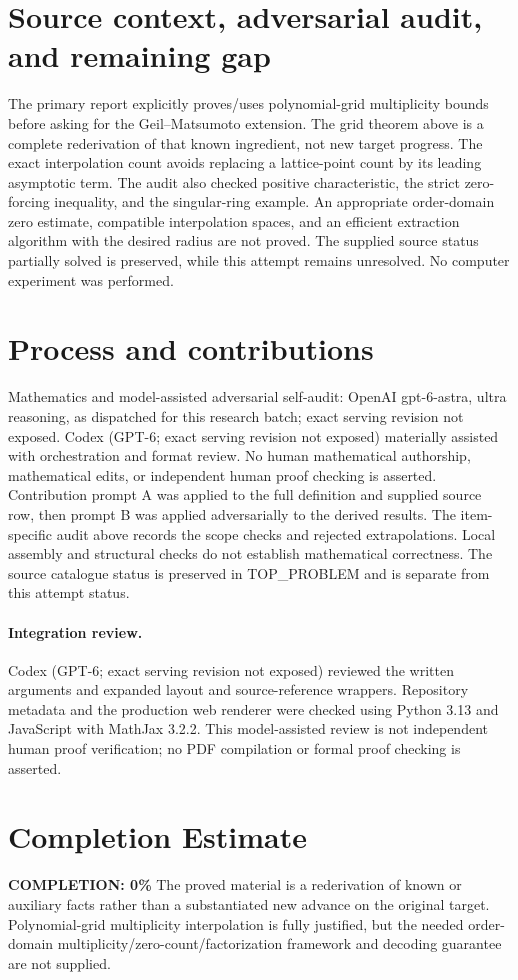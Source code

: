 \documentclass[11pt]{article}
\begin{document}
\section{Source context, adversarial audit, and remaining gap}
The primary report explicitly proves/uses polynomial-grid multiplicity bounds
before asking for the Geil--Matsumoto extension. The grid theorem above is a
complete rederivation of that known ingredient, not new target progress.
The exact interpolation count avoids replacing a lattice-point count by its
leading asymptotic term. The audit also checked positive characteristic,
the strict zero-forcing inequality, and the singular-ring example.
An appropriate order-domain zero estimate, compatible interpolation spaces,
and an efficient extraction algorithm with the desired radius are not proved.
The supplied source status partially solved is preserved, while this attempt
remains unresolved. No computer experiment was performed.

\section{Process and contributions}
Mathematics and model-assisted adversarial self-audit: OpenAI gpt-6-astra, ultra reasoning, as dispatched for this research batch; exact serving revision not exposed. Codex (GPT-6; exact serving revision not exposed) materially assisted with orchestration and format review. No human mathematical authorship, mathematical edits, or independent human proof checking is asserted.
Contribution prompt A was applied to the full definition and supplied source row, then prompt B was applied adversarially to the derived results. The item-specific audit above records the scope checks and rejected extrapolations. Local assembly and structural checks do not establish mathematical correctness. The source catalogue status is preserved in TOP\_PROBLEM and is separate from this attempt status.
\paragraph{Integration review.} Codex (GPT-6; exact serving revision not exposed) reviewed the written arguments and expanded layout and source-reference wrappers. Repository metadata and the production web renderer were checked using Python 3.13 and JavaScript with MathJax 3.2.2. This model-assisted review is not independent human proof verification; no PDF compilation or formal proof checking is asserted.

\section{Completion Estimate}
\noindent\textbf{COMPLETION: 0\%}
The proved material is a rederivation of known or auxiliary facts rather than a substantiated new advance on the original target. Polynomial-grid multiplicity interpolation is fully justified, but the needed order-domain multiplicity/zero-count/factorization framework and decoding guarantee are not supplied.
\end{document}
